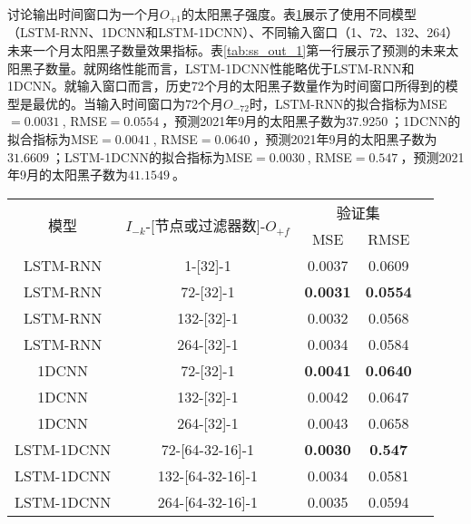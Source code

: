 讨论输出时间窗口为一个月$O_{+1}$的太阳黑子强度。表\ref{tab:ss_number_out_1}展示了使用不同模型（LSTM-RNN、1DCNN和LSTM-1DCNN）、不同输入窗口（1、72、132、264）未来一个月太阳黑子数量效果指标。表\ref{tab:ss_out_1}第一行展示了预测的未来太阳黑子数量。就网络性能而言，LSTM-1DCNN性能略优于LSTM-RNN和1DCNN。就输入窗口而言，历史72个月的太阳黑子数量作为时间窗口所得到的模型是最优的。当输入时间窗口为72个月$O_{-72}$时，LSTM-RNN的拟合指标为MSE$=\SI{0.0031}{}$, RMSE$=\SI{0.0554}{}$，预测2021年9月的太阳黑子数为$\SI{37.9250}{}$；1DCNN的拟合指标为MSE$=\SI{0.0041}{}$, RMSE$=\SI{0.0640}{}$，预测2021年9月的太阳黑子数为$\SI{31.6609}{}$；LSTM-1DCNN的拟合指标为MSE$=\SI{0.0030}{}$, RMSE$=\SI{0.547}{}$，预测2021年9月的太阳黑子数为$\SI{41.1549}{}$。

\begin{table}[!htbp]
  \centering
  \label{tab:ss_number_out_1}
  \footnotesize
  \renewcommand{\arraystretch}{1}
  \begin{tabular}{ccccc}
    \toprule
    \multirow{2}{*}{模型} & \multirow{2}{*}{$I_{-k}$-[节点或过滤器数]-$O_{+f}$} & \multicolumn{2}{c}{验证集}\\
    \cmidrule(lr){3-4}
    \noalign{\smallskip}
    & & MSE & RMSE\\
    \midrule 
    LSTM-RNN & 1-[32]-1 & 0.0037 & 0.0609 \\
    LSTM-RNN & 72-[32]-1 & \textbf{0.0031} & \textbf{0.0554} \\
    LSTM-RNN & 132-[32]-1 & 0.0032 & 0.0568 \\
    LSTM-RNN & 264-[32]-1 & 0.0034 & 0.0584 \\
    \hline
    1DCNN & 72-[32]-1 & \textbf{0.0041} & \textbf{0.0640} \\
    1DCNN & 132-[32]-1 & 0.0042 & 0.0647 \\
    1DCNN & 264-[32]-1 & 0.0043 & 0.0658 \\
    \hline
    LSTM-1DCNN & 72-[64-32-16]-1 & \textbf{0.0030} & \textbf{0.547} \\
    LSTM-1DCNN & 132-[64-32-16]-1 & 0.0034 & 0.0581 \\
    LSTM-1DCNN & 264-[64-32-16]-1 & 0.0035 & 0.0594 \\
    \bottomrule
  \end{tabular}
\end{table}


